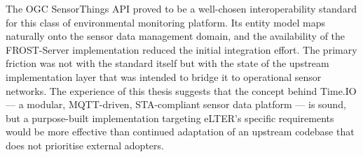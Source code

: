 \medskip\noindent
The OGC SensorThings API proved to be a well-chosen interoperability standard for this class
of environmental monitoring platform. Its entity model maps naturally onto the sensor data
management domain, and the availability of the FROST-Server implementation reduced the
initial integration effort. The primary friction was not with the standard itself but with
the state of the upstream implementation layer that was intended to bridge it to operational
sensor networks. The experience of this thesis suggests that the concept behind Time.IO ---
a modular, MQTT-driven, STA-compliant sensor data platform --- is sound, but a purpose-built
implementation targeting eLTER's specific requirements would be more effective than continued
adaptation of an upstream codebase that does not prioritise external adopters.
